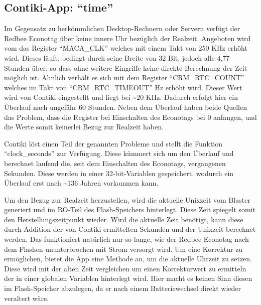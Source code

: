 \subsection{Contiki-App: "`time"'}

Im Gegensatz zu herkömmlichen Desktop-Rechnern oder Servern verfügt der Redbee Econotag über keine innere Uhr bezüglich der Realzeit.
Angeboten wird vom  das Register "`MACA\_CLK"' welches mit einem Takt von 250 KHz erhöht wird. Dieses läuft, bedingt durch
seine Breite von 32 Bit, jedoch alle 4,77 Stunden über, so dass ohne weitere Eingriffe keine direkte Berechnung der Zeit möglich ist.
Ähnlich verhält es sich mit dem Register "`CRM\_RTC\_COUNT"' welches im Takt von "`CRM\_RTC\_TIMEOUT"' Hz erhöht wird.
Dieser Wert wird von Contiki eingestellt und liegt bei \textasciitilde 20 KHz. Dadurch erfolgt hier ein Überlauf nach ungefähr 60 Stunden.
Neben dem Überlauf haben beide Quellen das Problem, dass die Register bei Einschalten des Econotags bei 0 anfangen, und die Werte somit
keinerlei Bezug zur Realzeit haben.

Contiki löst einen Teil der genannten Probleme und stellt die Funktion "`clock\_seconds"' zur Verfügung. Diese kümmert sich um den Überlauf
und berechnet laufend die, seit dem Einschalten des Econotags, vergangenen Sekunden. Diese werden in einer 32-bit-Variablen gespeichert,
wodurch ein Überlauf erst nach \textasciitilde 136 Jahren vorkommen kann.

Um den Bezug zur Realzeit herzustellen, wird die aktuelle Unixzeit vom Blaster generiert und im RO-Teil des Flash-Speichers hinterlegt.
Diese Zeit spiegelt somit den Herstellungszeitpunkt wieder. Wird die aktuelle Zeit benötigt, kann diese durch Addition der von Contiki
ermittelten Sekunden und der Unixzeit berechnet werden. Das funktioniert natürlich nur so lange, wie der Redbee Econotag nach dem Flashen
ununterbrochen mit Strom versorgt wird. Um eine Korrektur zu ermöglichen, bietet die App eine Methode an, um die aktuelle Uhrzeit zu setzen.
Diese wird mit der alten Zeit vergleichen um einen Korrekturwert zu ermitteln der in einer globalen Variablen hinterlegt wird. Hier macht es
keinen Sinn diesen im Flash-Speicher abzulegen, da er nach einem Batteriewechsel direkt wieder veraltert wäre.